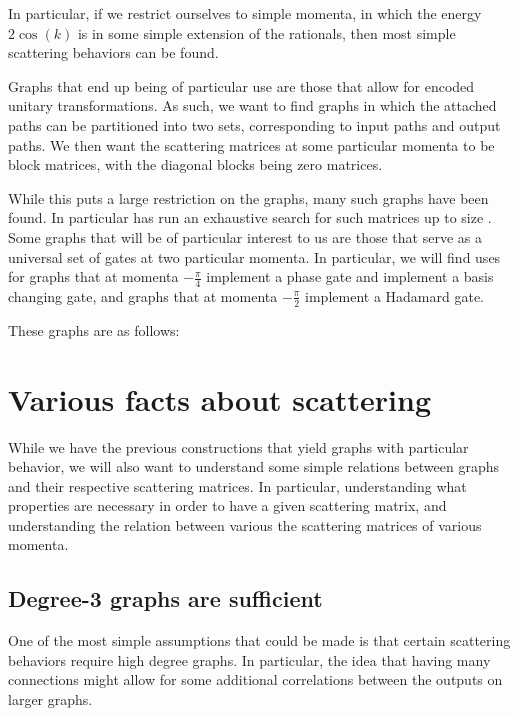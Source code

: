 \documentclass[../thesis-main/thesis-main]{subfiles}
\begin{document}
In particular, if we restrict ourselves to simple momenta, in which the energy $2\cos(k)$ is in some simple extension of the rationals, then most simple scattering behaviors can be found.  

Graphs that end up being of particular use are those that allow for encoded unitary transformations.  As such, we want to find graphs in which the attached paths can be partitioned into two sets, corresponding to input paths and output paths.  We then want the scattering matrices at some particular momenta to be block matrices, with the diagonal blocks being zero matrices.

While this puts a large restriction on the graphs, many such graphs have been found.  In particular  has run an exhaustive search for such matrices up to size .  Some graphs that will be of particular interest to us are those that serve as a universal set of gates at two particular momenta.  In particular, we will find uses for graphs that at momenta $-\frac{\pi}{4}$ implement a phase gate and implement a basis changing gate, and graphs that at momenta $-\frac{\pi}{2}$ implement a Hadamard gate. 

These graphs are as follows:



\section{Various facts about scattering}

While we have the previous constructions that yield graphs with particular behavior, we will also want to understand some simple relations between graphs and their respective scattering matrices.  In particular, understanding what properties are necessary in order to have a given scattering matrix, and understanding the relation between various the scattering matrices of various momenta.

\subsection{Degree-3 graphs are sufficient}

One of the most simple assumptions that could be made is that certain scattering behaviors require high degree graphs.  In particular, the idea that having many connections might allow for some additional correlations between the outputs on larger graphs.  
\end{document}
